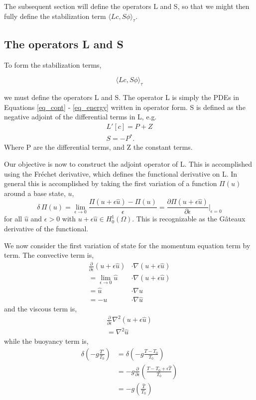 The subsequent section will define the operators L and S, so that we
might then fully define the stabilization term $\langle Lc,S\phi
\rangle_\tau$. 

%
%
\subsection{The operators L and S}


To form the stabilization terms, 

\begin{equation}
 \langle Lc,S\phi \rangle_\tau
\end{equation}

we must define the operators L and S. The operator L is simply the PDEs
in Equations \ref{eq_cont} - \ref{eq_energy} written in operator form. S is
defined as the negative adjoint of the differential terms in L, e.g.
\begin{align}
 L'[c] = P + Z \\
 S = -P^*. 
\end{align}
Where P are the differential terms, and Z the constant terms. 

Our objective is now to construct the adjoint operator of L. This is
accomplished using the Fr\'echet derivative, which defines the
functional derivative on L. In general this is accomplished by taking
the first variation of a function $\Pi(u)$ around a base state, $u$,
\begin{equation}
 \delta\, \Pi(u) = \lim_{\epsilon \to 0} \frac{\Pi(u+\epsilon \hat u) -
  \Pi(u)}{\epsilon} =
  \frac{\partial \Pi(u +\epsilon \hat u)}{\partial \epsilon}
  \bigg|_{\epsilon = 0}
\end{equation}
for all $\hat u$ and $\epsilon > 0$ with $u + \epsilon \hat u \in
H^1_0(\Omega)$. This is recognizable as the G\^{a}teaux
derivative of the functional. 


We now consider the first variation of state for the momentum equation
term by term. The convective term is, 
\begin{align}
 \frac{\partial}{\partial \epsilon} (u + \epsilon \hat u) &\cdot \nabla
  (u + \epsilon \hat u) \\
 = \lim_{\epsilon \to 0} \hat u &\cdot \nabla (u + \epsilon \hat u) \\
 = \hat u & \cdot \nabla u \\
 = - u &\cdot \nabla \hat u
\end{align}
and the viscous term is, 
\begin{align}
 \frac{\partial}{\partial \epsilon} \nabla^2 (u + \epsilon \hat u) \\
 = \nabla^2 \hat u
\end{align}
while the buoyancy term is, 
\begin{align}
 \delta \left(-g \frac{T'}{T_0}\right) &= \delta \left( -g
 \frac{T-T_0}{T_0} \right) \\
 &= -g \frac{\partial}{\partial \epsilon} \left( \frac{T-T_0+\epsilon
 \hat T}{T_0} \right) \\
 &= -g \left( \frac{\hat T}{T_0} \right) 
\end{align}


